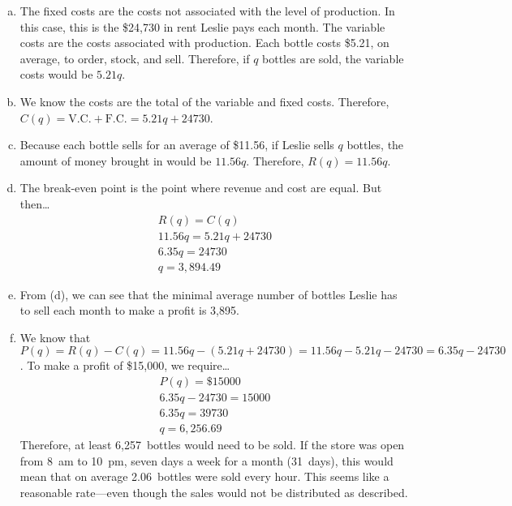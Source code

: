 \documentclass[11pt,letterpaper]{article}
\begin{document}
\sol 
\begin{enumerate}[(a)]
\item The fixed costs are the costs not associated with the level of production. In this case, this is the \$24,730 in rent Leslie pays each month. The variable costs are the costs associated with production. Each bottle costs \$5.21, on average, to order, stock, and sell. Therefore, if $q$ bottles are sold, the variable costs would be $5.21q$. \pspace

\item We know the costs are the total of the variable and fixed costs. Therefore, $C(q)= \text{V.C.} + \text{F.C.}= 5.21q + 24730$. 

\item Because each bottle sells for an average of \$11.56, if Leslie sells $q$ bottles, the amount of money brought in would be $11.56q$. Therefore, $R(q)= 11.56q$. \pspace

\item The break-even point is the point where revenue and cost are equal. But then\dots
	\[
	\begin{gathered}
	R(q)= C(q) \\
	11.56q= 5.21q + 24730 \\
	6.35q= 24730 \\
	q= 3,\!894.49
	\end{gathered}
	\]

\item From (d), we can see that the minimal average number of bottles Leslie has to sell each month to make a profit is 3,895. 

\item We know that $P(q)= R(q) - C(q)= 11.56q - (5.21q + 24730)= 11.56q - 5.21q - 24730= 6.35q - 24730$. To make a profit of \$15,000, we require\dots
	\[
	\begin{gathered}
	P(q)= \$15000 \\
	6.35q - 24730= 15000 \\
	6.35q= 39730 \\
	q= 6,\!256.69
	\end{gathered}
	\]
Therefore, at least 6,257~bottles would need to be sold. If the store was open from 8~am to 10~pm, seven days a week for a month (31~days), this would mean that on average 2.06~bottles were sold every hour. This seems like a reasonable rate---even though the sales would not be distributed as described. 
\end{enumerate}
\end{document}

